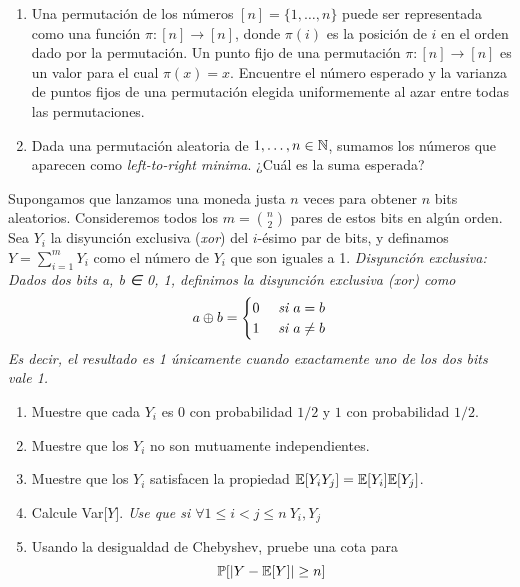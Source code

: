 \newpage
\begin{problema}{2}
	\begin{enumerate}[label=\arabic*.]
		\item Una permutación de los números $[n] = \{1,\dots, n\}$ puede ser representada como una función $\pi : [n] \to [n]$, donde $\pi(i)$ es la posición de $i$ en el orden dado por la permutación. Un punto fijo de una permutación $\pi : [n] \to [n]$ es un valor para el cual $\pi(x) = x$. Encuentre el número esperado y la varianza de puntos fijos de una permutación elegida uniformemente al azar entre todas las permutaciones.
		\item Dada una permutación aleatoria de ${1, \dots , n} \in \mathbb{N}$, sumamos los números que aparecen como \emph{left-to-right minima}. ¿Cuál es la suma esperada?
	\end{enumerate}
\end{problema}
\begin{solucion}
	
\end{solucion}

\newpage
\begin{problema}{3}
	Supongamos que lanzamos una moneda justa $n$ veces para obtener $n$ bits aleatorios. Consideremos todos los $m = \binom{n}{2}$ pares de estos bits en algún orden. Sea $Y_i$ la disyunción exclusiva (\emph{xor}) del $i$-ésimo par de bits, y definamos $Y = \sum^m_{i=1} Y_i$ como el número de $Y_i$ que son iguales a 1. \emph{Disyunción exclusiva: Dados dos bits a, b ∈ {0, 1}, definimos la disyunción exclusiva (xor) como}
	\[
		a \oplus b = \begin{cases}
			0 & \text{\emph{ si $a=b$}} \\
			1 & \text{\emph{ si $a\neq b$}}
		\end{cases}
	\]
	\emph{Es decir, el resultado es 1 únicamente cuando exactamente uno de los dos bits vale 1.}
	\begin{enumerate}[label=\alph*)]
		\item Muestre que cada $Y_i$ es $0$ con probabilidad $1/2$ y $1$ con probabilidad $1/2$.
		\item Muestre que los $Y_i$ no son mutuamente independientes.
		\item Muestre que los $Y_i$ satisfacen la propiedad $\mathbb{E}[Y_iY_j]=\mathbb{E}[Y_i]\mathbb{E}[Y_j]$.
		\item Calcule Var[$Y$]. \emph{Use que si $\forall 1 \leq i < j \leq n \ Y_i, Y_j$}
		\item Usando la desigualdad de Chebyshev, pruebe una cota para
			\[
				\mathbb{P}[|Y-\mathbb{E}[Y]|\geq n]
			\]
	\end{enumerate}
\end{problema}
\begin{solucion}
	
\end{solucion}
